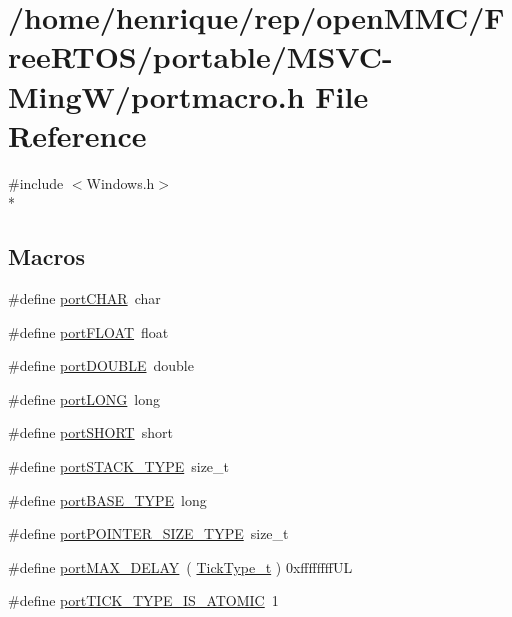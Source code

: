 \hypertarget{MSVC-MingW_2portmacro_8h}{\section{/home/henrique/rep/open\-M\-M\-C/\-Free\-R\-T\-O\-S/portable/\-M\-S\-V\-C-\/\-Ming\-W/portmacro.h File Reference}
\label{MSVC-MingW_2portmacro_8h}
}
{\ttfamily \#include $<$Windows.\-h$>$}\\*
\subsection*{Macros}
\begin{DoxyCompactItemize}
\item 
\#define \hyperlink{MSVC-MingW_2portmacro_8h_add0bdbfef5abf241c7774f68bde42f1d}{port\-C\-H\-A\-R}~char
\item 
\#define \hyperlink{MSVC-MingW_2portmacro_8h_a1bbe1ef117ec274ef919e0a930c888ac}{port\-F\-L\-O\-A\-T}~float
\item 
\#define \hyperlink{MSVC-MingW_2portmacro_8h_a4711ce186a903a14bc8ea7c8650b4f61}{port\-D\-O\-U\-B\-L\-E}~double
\item 
\#define \hyperlink{MSVC-MingW_2portmacro_8h_a6bbebff6020ac333ab6ec2ffd7f77001}{port\-L\-O\-N\-G}~long
\item 
\#define \hyperlink{MSVC-MingW_2portmacro_8h_a42e62d5881b12ff2a5c659576c64d003}{port\-S\-H\-O\-R\-T}~short
\item 
\#define \hyperlink{MSVC-MingW_2portmacro_8h_ab0a294066ac7369b8f59a52d9491a92c}{port\-S\-T\-A\-C\-K\-\_\-\-T\-Y\-P\-E}~size\-\_\-t
\item 
\#define \hyperlink{MSVC-MingW_2portmacro_8h_a1ebe82d24d764ae4e352f7c3a9f92c01}{port\-B\-A\-S\-E\-\_\-\-T\-Y\-P\-E}~long
\item 
\#define \hyperlink{MSVC-MingW_2portmacro_8h_a53bae25f223b7156dce0fc6e6b1b2295}{port\-P\-O\-I\-N\-T\-E\-R\-\_\-\-S\-I\-Z\-E\-\_\-\-T\-Y\-P\-E}~size\-\_\-t
\item 
\#define \hyperlink{MSVC-MingW_2portmacro_8h_a72723ba1e4a85ca14f25c2b9e066613d}{port\-M\-A\-X\-\_\-\-D\-E\-L\-A\-Y}~( \hyperlink{Flsh186_2prtmacro_8h_aa69c48c6e902ce54f70886e6573c92a9}{Tick\-Type\-\_\-t} ) 0xffffffff\-U\-L
\item 
\#define \hyperlink{MSVC-MingW_2portmacro_8h_a62e53bc6d3fa5c4bf4e65ab2752930f3}{port\-T\-I\-C\-K\-\_\-\-T\-Y\-P\-E\-\_\-\-I\-S\-\_\-\-A\-T\-O\-M\-I\-C}~1

\end{DoxyCompactItemize}
